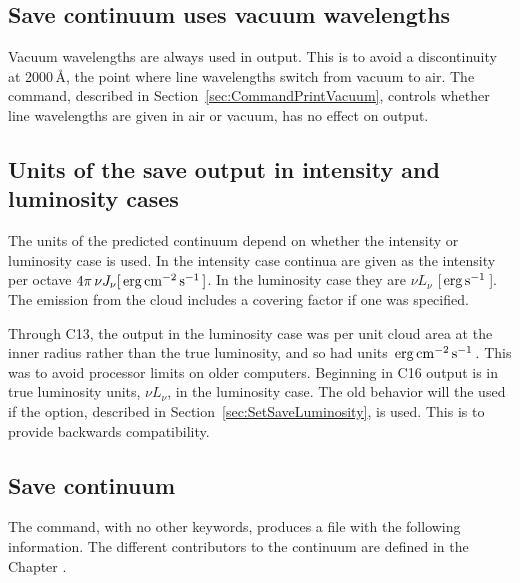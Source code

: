 \subsection{Save continuum uses vacuum wavelengths}
Vacuum wavelengths are always used in  output.
This is to avoid a discontinuity at 2000\,\AA, the point where line wavelengths switch from
vacuum to air.
The  command, 
described in Section~\ref{sec:CommandPrintVacuum},
controls whether line wavelengths
are given in air or vacuum, has no effect on  output.

\subsection{Units of the save output in intensity and luminosity cases}
The units of the predicted continuum depend on whether the intensity
or luminosity case is used.
In the intensity
case continua are given as the intensity per octave
$ 4\pi \,\nu J_\nu [\mbox{${\rm\thinspace erg}{\rm\thinspace cm}^{-2}{\rm\thinspace s}^{-1}\,$} ]$.
In the luminosity case they are
$\nu L_\nu$
[$\mbox{${\rm\thinspace erg}{\rm\thinspace s}^{-1}\,$} $].
The emission from the cloud includes a covering factor if one was specified.

Through C13, the  output 
in the luminosity case was per unit
cloud area at the inner radius rather than the true luminosity,
and so had units $\mbox{${\rm\thinspace erg}{\rm\thinspace cm}^{-2}{\rm\thinspace s}^{-1}\,$}$.
This was to avoid processor limits on older computers.
Beginning in C16 output is in true luminosity units, $\nu L_\nu$, in the luminosity case.
The old behavior will the used if the
 option, described in
Section~\ref{sec:SetSaveLuminosity}, is used.
This is to provide backwards compatibility.

\subsection{Save continuum}

The  command,
with no other keywords,
produces a file
with the following information.
The different contributors to the continuum
are defined in the Chapter .

